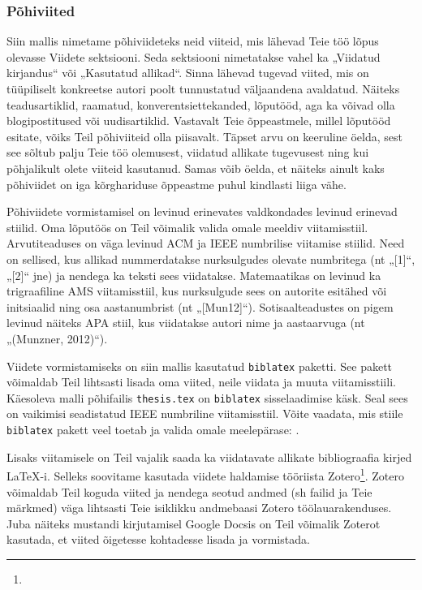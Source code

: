 \subsubsection{Põhiviited}
Siin mallis nimetame põhiviideteks neid viiteid, mis lähevad Teie töö lõpus olevasse Viidete sektsiooni. Seda sektsiooni nimetatakse vahel ka „Viidatud kirjandus“ või „Kasutatud allikad“. Sinna lähevad tugevad viited, mis on tüüpiliselt konkreetse autori poolt tunnustatud väljaandena avaldatud. Näiteks teadusartiklid, raamatud, konverentsiettekanded, lõputööd, aga ka võivad olla blogipostitused või uudisartiklid. Vastavalt Teie õppeastmele, millel lõputööd esitate, võiks Teil põhiviiteid olla piisavalt. Täpset arvu on keeruline öelda, sest see sõltub palju Teie töö olemusest, viidatud allikate tugevusest ning kui põhjalikult olete viiteid kasutanud. Samas võib öelda, et näiteks ainult kaks põhiviidet on iga kõrghariduse õppeastme puhul kindlasti liiga vähe.

Põhiviidete vormistamisel on levinud erinevates valdkondades levinud erinevad stiilid. Oma lõputöös on Teil võimalik valida omale meeldiv viitamisstiil. Arvutiteaduses on väga levinud ACM ja IEEE numbrilise viitamise stiilid. Need on sellised, kus allikad nummerdatakse nurksulgudes olevate numbritega (nt „[1]“, „[2]“ jne) ja nendega ka teksti sees viidatakse. Matemaatikas on levinud ka trigraafiline AMS viitamisstiil, kus nurksulgude sees on autorite esitähed või initsiaalid ning osa aastanumbrist (nt „[Mun12]“). Sotisaalteadustes on pigem levinud näiteks APA stiil, kus viidatakse autori nime ja aastaarvuga (nt „(Munzner, 2012)“).

Viidete vormistamiseks on siin mallis kasutatud \verb|biblatex| paketti. See pakett võimaldab Teil lihtsasti lisada oma viited, neile viidata ja muuta viitamisstiili. Käesoleva malli põhifailis \verb|thesis.tex| on \verb|biblatex| sisselaadimise käsk. Seal sees on vaikimisi seadistatud IEEE numbriline viitamisstiil. Võite vaadata, mis stiile \verb|biblatex| pakett veel toetab ja valida omale meelepärase: .

Lisaks viitamisele on Teil vajalik saada ka viidatavate allikate bibliograafia kirjed LaTeX-i. Selleks soovitame kasutada viidete haldamise tööriista Zotero\footnote{}. Zotero võimaldab Teil koguda viited ja nendega seotud andmed (sh failid ja Teie märkmed) väga lihtsasti Teie isiklikku andmebaasi Zotero töölauarakenduses. Juba näiteks mustandi kirjutamisel Google Docsis on Teil võimalik Zoterot kasutada, et viited õigetesse kohtadesse lisada ja vormistada.

